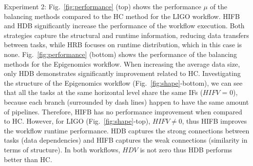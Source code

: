 \documentclass[final]{IEEEtran}
\begin{document}
Experiment 2: Fig.~\ref{fig:performance} (top) shows the performance $\mu$ of the balancing methods compared to the HC method for the LIGO workflow. HIFB and HDB significantly increase the performance of the workflow execution. Both strategies capture the structural and runtime information, reducing data transfers between tasks, while HRB focuses on runtime distribution, which in this case is none. Fig.~\ref{fig:performance} (bottom) shows the performance of the balancing methods for the Epigenomics workflow. When increasing the average data size, only HDB demonstrates significantly improvement related to HC. Investigating the structure of the Epigenomics workflow (Fig.~\ref{fig:shape}-bottom), we can see that all the tasks at the same horizontal level share the same IFs ($HIFV$ = 0), because each branch (surrounded by dash lines) happen to have the same amount of pipelines. Therefore, HIFB has no performance improvement when compared to HC. However, for LIGO (Fig.~\ref{fig:shape}-top), $HIFV \neq 0$, thus HIFB improves the workflow runtime performance.  
HDB captures the strong connections between tasks (data dependencies) and HIFB captures the weak connections (similarity in terms of structure). In both workflows, $HDV$ is not zero thus HDB performs better than HC. 

\end{document}
